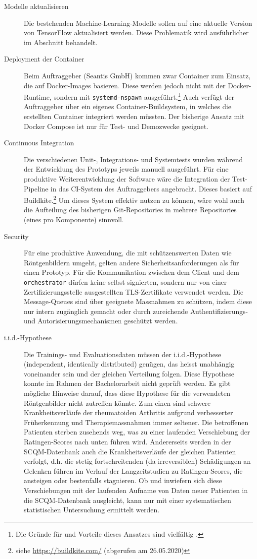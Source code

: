 \begin{description}
    \item[Modelle aktualisieren] Die bestehenden Machine-Learning-Modelle sollen auf eine aktuelle Version von TensorFlow aktualisiert werden. Diese Problematik wird ausführlicher im Abschnitt  behandelt.
    \item [Deployment der Container] Beim Auftraggeber (Seantis GmbH) kommen zwar Container zum Einsatz, die auf Docker-Images basieren. Diese werden jedoch nicht mit der Docker-Runtime, sondern mit \texttt{systemd-nspawn} ausgeführt.\footnote{Die Gründe für und Vorteile dieses Ansatzes sind vielfältig \cite{docker-vs-systemd}.} Auch verfügt der Auftraggeber über ein eigenes Container-Buildsystem, in welches die erstellten Container integriert werden müssten. Der bisherige Ansatz mit Docker Compose ist nur für Test- und Demozwecke geeignet.
    \item [Continuous Integration] Die verschiedenen Unit-, Integrations- und Systemtests wurden während der Entwicklung des Prototyps jeweils manuell ausgeführt. Für eine produktive Weiterentwicklung der Software wäre die Integration der Test-Pipeline in das CI-System des Auftraggebers angebracht. Dieses basiert auf Buildkite.\footnote{siehe \url{https://buildkite.com/} (abgerufen am 26.05.2020)} Um dieses System effektiv nutzen zu können, wäre wohl auch die Aufteilung des bisherigen Git-Repositories in mehrere Repositories (eines pro Komponente) sinnvoll.
    \item [Security] Für eine produktive Anwendung, die mit schützenswerten Daten wie Röntgenbildern umgeht, gelten andere Sicherheitsanforderungen als für einen Prototyp. Für die Kommunikation zwischen dem Client und dem \texttt{orchestrator} dürfen keine selbst signierten, sondern nur von einer Zertifizierungsstelle ausgestellten TLS-Zertifikate verwendet werden. Die Message-Queues sind über geeignete Massnahmen zu schützen, indem diese nur intern zugänglich gemacht oder durch zureichende Authentifizierungs- und Autorisierungsmechanismen geschützt werden.
    \item [i.i.d.-Hypothese] Die Trainings- und Evaluationsdaten müssen der i.i.d.-Hypothese (independent, identically distributed) genügen, das heisst unabhängig voneinander sein und der gleichen Verteilung folgen. Diese Hypothese konnte im Rahmen der Bachelorarbeit nicht geprüft werden. Es gibt mögliche Hinweise darauf, dass diese Hypothese für die verwendeten Röntgenbilder nicht zutreffen könnte. Zum einen sind schwere Krankheitsverläufe der rheumatoiden Arthritis aufgrund verbesserter Früherkennung und Therapiemassnahmen immer seltener. Die betroffenen Patienten sterben zusehends weg, was zu einer laufenden Verschiebung der Ratingen-Scores nach unten führen wird. Andererseits werden in der SCQM-Datenbank auch die Krankheitsverläufe der gleichen Patienten verfolgt, d.h. die stetig fortschreitenden (da irreversiblen) Schädigungen an Gelenken führen im Verlauf der Langzeitstudien zu Ratingen-Scores, die ansteigen oder bestenfalls stagnieren. Ob und inwiefern sich diese Verschiebungen mit der laufenden Aufname von Daten neuer Patienten in die SCQM-Datenbank ausgleicht, kann nur mit einer systematischen statistischen Untersuchung ermittelt werden.

\end{description}
